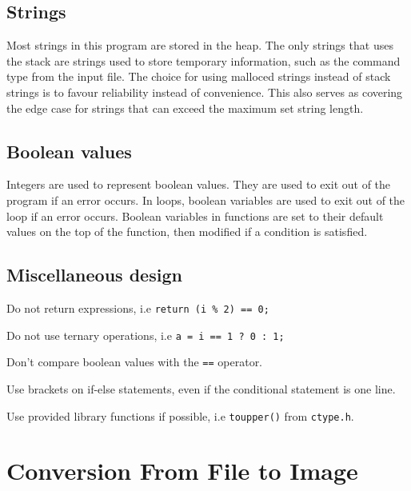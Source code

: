 \documentclass[a4paper, 12pt, titlepage]{article}
\newcommand{\code}[1]{\small\texttt{#1}\normalsize}
\begin{document}
\subsection{Strings}

Most strings in this program are stored in the heap. The only strings 
that uses the stack are strings used to store temporary information, 
such as the command type from the input file. The choice for using 
malloced strings instead of stack strings is to favour reliability 
instead of convenience. This also serves as covering the edge case 
for strings that can exceed the maximum set string length.

\subsection{Boolean values}

Integers are used to represent boolean values. They are used to exit 
out of the program if an error occurs. In loops, boolean variables are 
used to exit out of the loop if an error occurs. Boolean variables in 
functions are set to their default values on the top of the function, then 
modified if a condition is satisfied.

\subsection{Miscellaneous design}

\begin{itemize}[label={--}]
\begin{samepage}
    \item Do not return expressions, i.e \code{return (i \% 2) == 0;}
    \item Do not use ternary operations, i.e \code{a = i == 1 ? 0 : 1;}
    \item Don't compare boolean values with the \code{==} operator.
    \item Use brackets on if-else statements, even if the conditional 
          statement is one line.
    \item Use provided library functions if possible, i.e \code{toupper()} 
          from \code{ctype.h}.
\end{samepage}
\end{itemize}

\newpage


\section{Conversion From File to Image}
\end{document}
